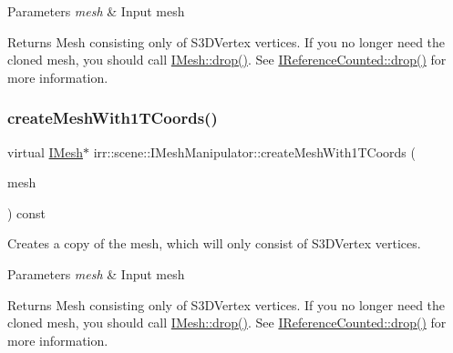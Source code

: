 \begin{DoxyParams}{Parameters}
{\em mesh} & Input mesh \\
\hline
\end{DoxyParams}
\begin{DoxyReturn}{Returns}
Mesh consisting only of S3\+D\+Vertex vertices. If you no longer need the cloned mesh, you should call \hyperlink{classirr_1_1IReferenceCounted_a03856a09355b89d178090c4a5f738543}{I\+Mesh\+::drop()}. See \hyperlink{classirr_1_1IReferenceCounted_a03856a09355b89d178090c4a5f738543}{I\+Reference\+Counted\+::drop()} for more information. 
\end{DoxyReturn}
\mbox{\label{classirr_1_1scene_1_1IMeshManipulator_af7feb558fbaad9671667d1332c83bb5d}} 
\subsubsection{\texorpdfstring{create\+Mesh\+With1\+T\+Coords()}{createMeshWith1TCoords()}\hspace{0.1cm}{\footnotesize\ttfamily [2/2]}}
{\footnotesize\ttfamily virtual \hyperlink{classirr_1_1scene_1_1IMesh}{I\+Mesh}$\ast$ irr\+::scene\+::\+I\+Mesh\+Manipulator\+::create\+Mesh\+With1\+T\+Coords (\begin{DoxyParamCaption}\item[{\hyperlink{classirr_1_1scene_1_1IMesh}{I\+Mesh} $\ast$}]{mesh }\end{DoxyParamCaption}) const\hspace{0.3cm}{\ttfamily [pure virtual]}}



Creates a copy of the mesh, which will only consist of S3\+D\+Vertex vertices. 


\begin{DoxyParams}{Parameters}
{\em mesh} & Input mesh \\
\hline
\end{DoxyParams}
\begin{DoxyReturn}{Returns}
Mesh consisting only of S3\+D\+Vertex vertices. If you no longer need the cloned mesh, you should call \hyperlink{classirr_1_1IReferenceCounted_a03856a09355b89d178090c4a5f738543}{I\+Mesh\+::drop()}. See \hyperlink{classirr_1_1IReferenceCounted_a03856a09355b89d178090c4a5f738543}{I\+Reference\+Counted\+::drop()} for more information. 
\end{DoxyReturn}
\mbox{\label{classirr_1_1scene_1_1IMeshManipulator_abf123f6fece99816be402e1edf70dc13}} 
